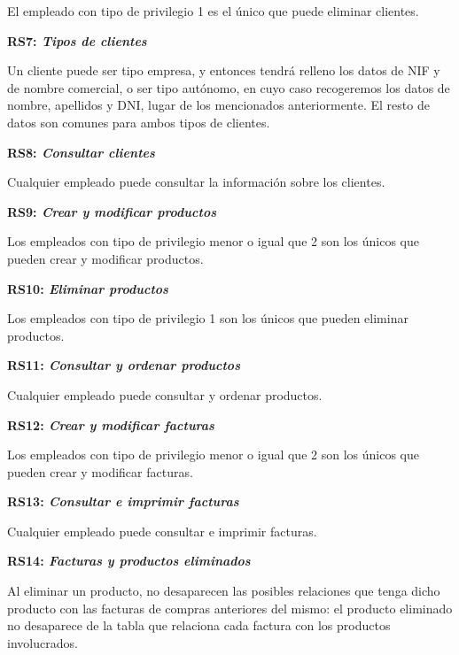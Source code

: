 \documentclass[paper=a4, fontsize=11pt, spanish]{scrartcl}
\begin{document}
El empleado con tipo de privilegio 1 es el único que puede eliminar clientes.

\setlength{\parindent}{0em}
\textbf{RS7: \textit{Tipos de clientes}}
\setlength{\parindent}{2em}

Un cliente puede ser tipo empresa, y entonces tendrá relleno los datos de NIF y de nombre comercial, o ser tipo autónomo, en cuyo caso recogeremos los datos de nombre, apellidos y DNI, lugar de los mencionados anteriormente. El resto de datos son comunes para ambos tipos de clientes.

\setlength{\parindent}{0em}
\textbf{RS8: \textit{Consultar clientes}}
\setlength{\parindent}{2em}

Cualquier empleado puede consultar la información sobre los clientes.

\setlength{\parindent}{0em}
\textbf{RS9: \textit{Crear y modificar productos}}
\setlength{\parindent}{2em}

Los empleados con tipo de privilegio menor o igual que 2 son los únicos que pueden crear y modificar productos.

\setlength{\parindent}{0em}
\textbf{RS10: \textit{Eliminar productos}}
\setlength{\parindent}{2em}

Los empleados con tipo de privilegio 1 son los únicos que pueden eliminar productos.

\setlength{\parindent}{0em}
\textbf{RS11: \textit{Consultar y ordenar productos}}
\setlength{\parindent}{2em}

Cualquier empleado puede consultar y ordenar productos.

\setlength{\parindent}{0em}
\textbf{RS12: \textit{Crear y modificar facturas}}
\setlength{\parindent}{2em}

Los empleados con tipo de privilegio menor o igual que 2 son los únicos que pueden crear y modificar facturas.

\setlength{\parindent}{0em}
\textbf{RS13: \textit{Consultar e imprimir facturas}}
\setlength{\parindent}{2em}

Cualquier empleado puede consultar e imprimir facturas.

\setlength{\parindent}{0em}
\textbf{RS14: \textit{Facturas y productos eliminados}}
\setlength{\parindent}{2em}

Al eliminar un producto, no desaparecen las posibles relaciones que tenga dicho producto con las facturas de compras anteriores del mismo: el producto eliminado no desaparece de la tabla que relaciona cada factura con los productos involucrados.
\end{document}
